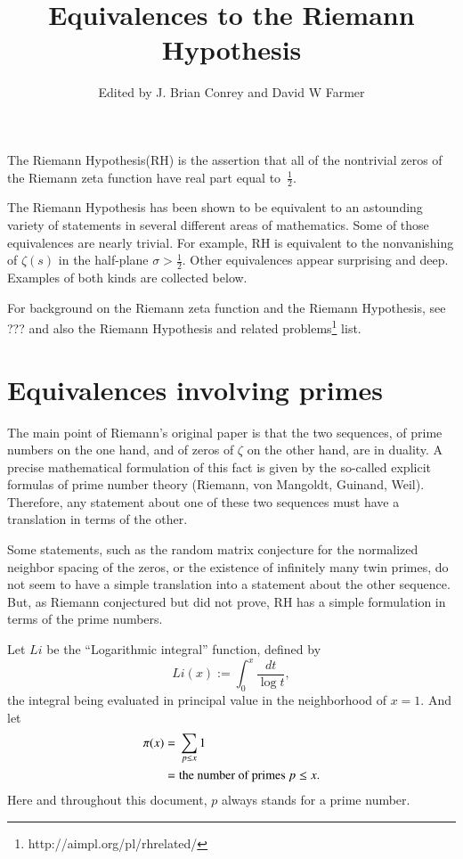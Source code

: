 \documentclass[12pt,letterpaper, reqno]{aimpl}
\newcommand{\htmladdnormallink}[2]{{#1}\footnote{#2}}
\begin{document}
\title{Equivalences to the Riemann Hypothesis}
\author{Edited by J. Brian Conrey and David W Farmer}


\maketitle

The Riemann Hypothesis(RH)
is the assertion that all of the nontrivial zeros of the Riemann
zeta function have real part equal to~$\frac12$.

The Riemann Hypothesis has been shown to be equivalent to an
astounding variety of statements in several different areas
of mathematics.  Some of those equivalences are nearly trivial.
For example, RH is equivalent to the nonvanishing of $\zeta(s)$ in the
half-plane $\sigma>\frac12$.  Other equivalences appear surprising
and deep.  Examples of both kinds are collected below.

For background on the Riemann zeta function and the Riemann Hypothesis,
see ??? and also the \htmladdnormallink{Riemann Hypothesis and related problems}{http://aimpl.org/pl/rhrelated/} list.


\section{Equivalences involving primes}

The main point of Riemann's original paper
is that the two sequences, of prime numbers on the one hand, and of zeros
of $\zeta$ on the other hand, are in duality. A precise mathematical
formulation of this fact is given by the so-called explicit formulas of
prime number theory (Riemann, von Mangoldt, Guinand, Weil). Therefore,
any statement about one of these two sequences must have a translation
in terms of the other.

Some statements, such as the random matrix conjecture for the
normalized neighbor spacing of the zeros,
or the existence of infinitely many twin primes, do not seem
to have a simple translation into a statement about the other
sequence.
But, as Riemann conjectured but did not prove, RH has a
simple formulation in terms of the prime numbers.

Let $Li$ be the ``Logarithmic integral'' function, defined by
$$
Li(x) := \int_0^x \frac{dt}{\log t},
$$
the integral being evaluated in principal value in the neighborhood of $x=1$.
And let
\begin{align}
\pi(x) =\mathstrut & \sum_{p\le x} 1 \\
	=\mathstrut & \text{the number of primes } p\le x .
\end{align}
Here and throughout this document, $p$ always stands for a prime number.
\end{document}
